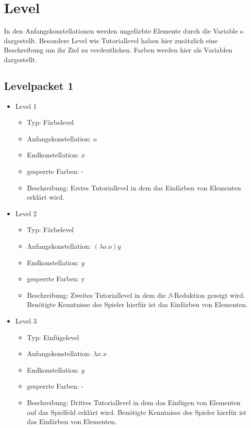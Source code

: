 \chapter{Level}
In den Anfangskonstellationen werden ungefärbte Elemente durch die Variable o dargestellt. 
Besondere Level wie Tutoriallevel haben hier zusätzlich eine Beschreibung um ihr Ziel zu verdeutlichen.
Farben werden hier als Variablen dargestellt.

\section{Levelpacket 1}
\begin{itemize}
	\item{Level 1} 
		\begin{itemize}
			\item{Typ:} Färbelevel 
			\item{Anfangskonstellation:} \( o\)
			\item{Endkonstellation:} \( x\)
			\item{gesperrte Farben:} -  
			\item{Beschreibung:} Erstes Tutoriallevel in dem das Einfärben von Elementen erklärt wird.
		\end{itemize}

	\item{Level 2} 
		\begin{itemize}
			\item{Typ:} Färbelevel 
			\item{Anfangskonstellation:} \((\lambda o . o ) y\)   
			\item{Endkonstellation:} \(y\) 
			\item{gesperrte Farben:} y 
			\item{Beschreibung:} Zweites Tutoriallevel in dem die \(\beta\)-Reduktion gezeigt wird.
								Benötigte Kenntnisse des Spieler hierfür ist das Einfärben von Elementen. 
		\end{itemize}

	\item{Level 3} 
		\begin{itemize}
			\item{Typ:} Einfügelevel 
			\item{Anfangskonstellation:} \(\lambda x . x \)   
			\item{Endkonstellation:} \(y\)
			\item{gesperrte Farben:} -  
			\item{Beschreibung:} Drittes Tutoriallevel in dem das Einfügen von Elementen auf das Spielfeld erklärt wird.
								Benötigte Kenntnisse des Spieler hierfür ist das Einfärben von Elementen. 
		\end{itemize}


\end{itemize}
